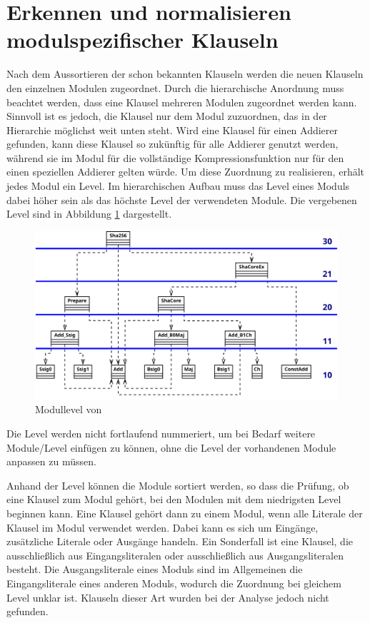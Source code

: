 \section{Erkennen und normalisieren modulspezifischer Klauseln}
\label{sec:ana:module}

Nach dem Aussortieren der schon bekannten Klauseln werden die neuen Klauseln den einzelnen Modulen zugeordnet. Durch die hierarchische Anordnung
muss beachtet werden, dass eine Klausel mehreren Modulen zugeordnet werden kann. Sinnvoll ist es jedoch, die Klausel nur dem Modul zuzuordnen,
das in der Hierarchie möglichst weit unten steht. Wird eine Klausel für einen Addierer gefunden, kann diese Klausel so zukünftig für alle Addierer
genutzt werden, während sie im Modul für die vollständige Kompressionsfunktion nur für den einen speziellen Addierer gelten würde. Um diese
Zuordnung zu realisieren, erhält jedes Modul ein Level. Im hierarchischen Aufbau muss das Level eines Moduls dabei höher sein als das höchste Level
der verwendeten Module. Die vergebenen Level sind in Abbildung \ref{fig:sha256_module_level} dargestellt.
\begin{figure}[!h]
  \centering
  \includegraphics[scale=0.265]{images/module_level}
  \caption{Modullevel von }
  \label{fig:sha256_module_level}
\end{figure}

Die Level werden nicht fortlaufend nummeriert, um bei Bedarf weitere Module/Level einfügen zu können, ohne die Level der vorhandenen Module anpassen zu müssen.

Anhand der Level können die Module sortiert werden, so dass die Prüfung, ob eine Klausel zum Modul gehört, bei den Modulen mit dem niedrigsten Level beginnen kann.
Eine Klausel gehört dann zu einem Modul, wenn alle Literale der Klausel im Modul verwendet werden. Dabei kann es sich um Eingänge, zusätzliche Literale oder Ausgänge
handeln. Ein Sonderfall ist eine Klausel, die ausschließlich aus Eingangsliteralen oder ausschließlich aus Ausgangsliteralen besteht. Die Ausgangsliterale eines Moduls
sind im Allgemeinen die Eingangsliterale eines anderen Moduls, wodurch die Zuordnung bei gleichem Level unklar ist. Klauseln dieser Art wurden bei der Analyse jedoch
nicht gefunden. 

